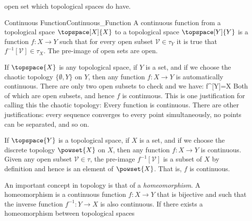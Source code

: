 \documentclass[oneside]{book}                                                  %
\begin{document}
                open set which topological spaces do have.
                \begin{fdefinition}{Continuous Function}{Continuous_Function}
                    A continuous function from a topological space
                    $\topspace[X]{X}$ to a topological space $\topspace[Y]{Y}$
                    is a function $f:X\rightarrow{Y}$ such that for every open
                    subset $\mathcal{V}\in\tau_{Y}$ it is true that
                    $f^{\minus{1}}[\mathcal{V}]\in\tau_{X}$. The pre-image of
                    open sets are open.
                \end{fdefinition}
                \begin{example}
                    If $\topspace{X}$ is any topological space, if
                    $Y$ is a set, and if we choose the chaotic topology
                    $\{\emptyset,Y\}$ on $Y$, then any function
                    $f:X\rightarrow{Y}$ is automatically continuous. There are
                    only two open subsets to check and we have:
                                {f^{}[Y]=X}
                    Both of which are open subsets, and hence $f$ is continuous.
                    This is one justification for calling this the chaotic
                    topology: Every function is continuous. There are other
                    justifications: every sequence converges to every point
                    simultaneously, no points can be separated, and so on.
                \end{example}
                \begin{example}
                    If $\topspace{Y}$ is a topological space, if $X$ is a set,
                    and if we choose the discrete topology $\powset{X}$ on $X$,
                    then any function $f:X\rightarrow{Y}$ is continuous. Given
                    any open subset $\mathcal{V}\in\tau$, the pre-image
                    $f^{\minus{1}}[\mathcal{V}]$ is a subset of $X$ by
                    definition and hence is an element of $\powset{X}$. That is,
                    $f$ is continuous.
                \end{example}
                An important concept in topology is that of a
                \textit{homeomorphism}. A homeomorphism is a continuous function
                $f:X\rightarrow{Y}$ that is bijective and such that the inverse
                function $f^{\minus{1}}:Y\rightarrow{X}$ is also continuous.
                If there exists a homeomorphism between topological spaces
\end{document}
